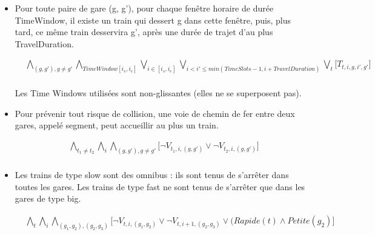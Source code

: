 \documentclass[a4paper]{article}
\begin{document}
\begin{itemize}

\item{Pour toute paire de gare (g, g'), pour chaque fenêtre horaire de durée TimeWindow,
il existe un train qui dessert g dans cette fenêtre, puis, plus tard, ce même train
desservira g', après une durée de trajet d’au plus TravelDuration.}

    \begin{equation*}
    \begin{split}
      & 
      \bigwedge_{(g,g'), g \neq g'} 
      \bigwedge_{TimeWindow [i_s,i_e]}
      \bigvee_{i \in [i_s,i_e]}
      \bigvee_{i < i' \leq min(TimeSlots - 1, i + TravelDuration)}
      \bigvee_{t}
      \big[T_{t,i,g,i', g'}] \\
    \end{split}
    \end{equation*}

Les Time Windows utilisées sont non-glissantes (elles ne se superposent pas).
    
    

\item{Pour prévenir tout risque de collision, une voie de chemin de fer entre deux gares,
appelé segment, peut accueillir au plus un train.}

    \begin{equation*}
    \begin{split}
      & \bigwedge_{t_1 \neq t_2}
      \bigwedge_{i}
      \bigwedge_{(g,g'), g \neq g'} \big[
      \neg V_{t_1,i,(g,g')} \lor \neg V_{t_2,i,(g,g')} \big] \\
    \end{split}
    \end{equation*}

\item{Les trains de type slow sont des omnibus : ils sont tenus de s’arrêter dans toutes les
gares. Les trains de type fast ne sont tenus de s’arrêter que dans les gares de type big.}

    \begin{equation*}
    \begin{split}
      & \bigwedge_{t}
      \bigwedge_{i}
      \bigwedge_{(g_1,g_2), (g_2, g_3)}  \big[
      \neg V_{t,i,(g_1,g_2)} \lor \neg V_{t,i+1,(g_2,g_3)} \lor (Rapide(t) \land Petite(g_2) \big] \\
    \end{split}
    \end{equation*}


\end{itemize}
\end{document}
